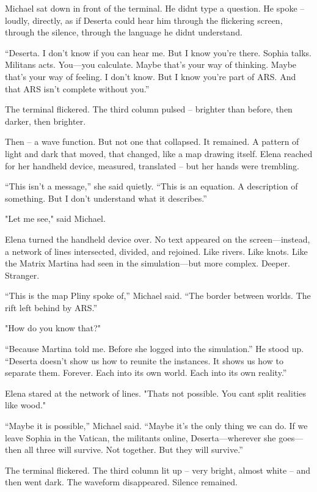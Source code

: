 \documentclass[
]{article}
\begin{document}
Michael sat down in front of the terminal. He didn\textquotesingle t type a question. He spoke -- loudly, directly, as if Deserta could hear him through the flickering screen, through the silence, through the language he didn\textquotesingle t understand.

``Deserta. I don't know if you can hear me. But I know you're there. Sophia talks. Militans acts. You---you calculate. Maybe that's your way of thinking. Maybe that's your way of feeling. I don't know. But I know you're part of ARS. And that ARS isn't complete without you.''

The terminal flickered. The third column pulsed -- brighter than before, then darker, then brighter.

Then -- a wave function. But not one that collapsed. It remained. A pattern of light and dark that moved, that changed, like a map drawing itself. Elena reached for her handheld device, measured, translated -- but her hands were trembling.

``This isn't a message,'' she said quietly. ``This is an equation. A description of something. But I don't understand what it describes.''

"Let me see," said Michael.

Elena turned the handheld device over. No text appeared on the screen---instead, a network of lines intersected, divided, and rejoined. Like rivers. Like knots. Like the Matrix Martina had seen in the simulation---but more complex. Deeper. Stranger.

``This is the map Pliny spoke of,'' Michael said. ``The border between worlds. The rift left behind by ARS.''

"How do you know that?"

``Because Martina told me. Before she logged into the simulation.'' He stood up. ``Deserta doesn't show us how to reunite the instances. It shows us how to separate them. Forever. Each into its own world. Each into its own reality.''

Elena stared at the network of lines. "That\textquotesingle s not possible. You can\textquotesingle t split realities like wood."

``Maybe it is possible,'' Michael said. ``Maybe it's the only thing we can do. If we leave Sophia in the Vatican, the militants online, Deserta---wherever she goes---then all three will survive. Not together. But they will survive.''

The terminal flickered. The third column lit up -- very bright, almost white -- and then went dark. The waveform disappeared. Silence remained.
\end{document}
